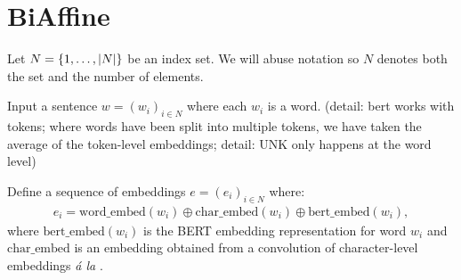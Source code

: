 \documentclass{report}
\theoremstyle{definition}
\theoremstyle{plain}
\theoremstyle{definition}
\theoremstyle{remark}
\numberwithin{equation}{section}
\numberwithin{figure}{section}
\numberwithin{table}{section}
\begin{document}
\setcounter{secnumdepth}{3}

\section{BiAffine}

Let \(N = \qty{1, \ldots, \abs{N}}\) be an index set. We will abuse notation so \(N\) denotes both the set and the number of elements.

Input a sentence \(w= (w_{i})_{i\in N}\) where each \(w_{i}\) is a word. (detail: bert works with tokens; where words have been split into multiple tokens, we have taken the average of the token-{}level embeddings; detail: UNK only happens at the word level)

Define a sequence of embeddings \(e = (e_{i})_{i\in N}\) where: 
\begin{align}
e_{i} = \text{word\_embed}(w_{i}) \oplus \text{char\_embed}(w_{i}) \oplus \text{bert\_embed}(w_{i}),
\end{align} where \(\text{bert\_embed}(w_{i})\) is the BERT embedding representation for word \(w_{i}\) and \(\text{char\_embed}\) is an embedding obtained from a convolution of character-{}level embeddings \emph{á la} \textcite[{}][{}]{chiu2016named}.
\end{document}
